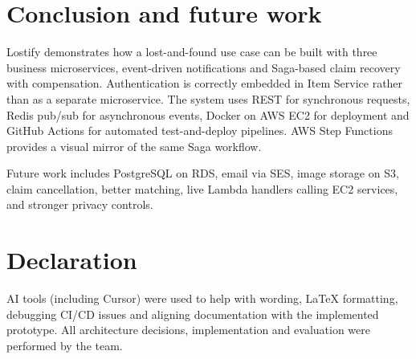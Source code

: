 \documentclass[11pt,a4paper]{article}
\begin{document}
\section{Conclusion and future work}

Lostify demonstrates how a lost-and-found use case can be built with three business microservices,
event-driven notifications and Saga-based claim recovery with compensation. Authentication is
correctly embedded in Item Service rather than as a separate microservice. The system uses REST
for synchronous requests, Redis pub/sub for asynchronous events, Docker on AWS EC2 for deployment
and GitHub Actions for automated test-and-deploy pipelines. AWS Step Functions provides a visual
mirror of the same Saga workflow.

Future work includes PostgreSQL on RDS, email via SES, image storage on S3, claim cancellation,
better matching, live Lambda handlers calling EC2 services, and stronger privacy controls.

\section*{Declaration}

AI tools (including Cursor) were used to help with wording, LaTeX formatting, debugging CI/CD
issues and aligning documentation with the implemented prototype. All architecture decisions,
implementation and evaluation were performed by the team.
\end{document}
